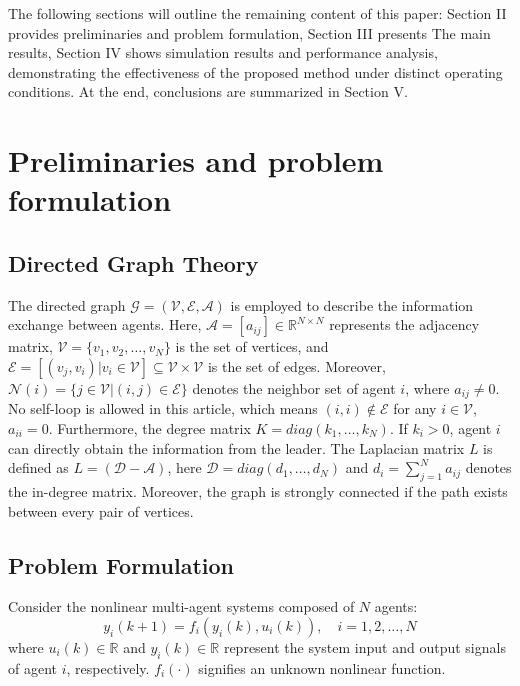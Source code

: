 \documentclass[journal,onecolumn]{IEEEtran}
\begin{document}
    The following sections will outline the remaining content of this paper:
    Section II provides preliminaries and problem formulation, Section III presents The main results, Section IV shows simulation results and performance analysis, demonstrating the effectiveness of the proposed method under distinct operating conditions. At the end, conclusions are summarized in Section V.


\section{Preliminaries and problem formulation}\label{section:2}
\subsection{Directed Graph Theory}

\indent The directed graph $ \mathcal{G} = (\mathcal{V}, \mathcal{E}, \mathcal{A}) $ is employed to describe the information exchange between agents. Here, $ \mathcal{A} = [a_{ij}] \in \mathbb{R}^{N \times N} $ represents the adjacency matrix, $ \mathcal{V}=\{v_1, v_2,\dots,v_N\} $ is the set of vertices, and $ \mathcal{E} = [(v_j,v_i)|v_i \in \mathcal{V} ] \subseteq \mathcal{V} \times \mathcal{V}$ is the set of edges. Moreover, $ \mathcal{N}(i) = \{j \in \mathcal{V} |(i,j) \in \mathcal{E}\} $ denotes the neighbor set of agent $ i $, where $ a_{i j} \neq 0$. No self-loop is allowed in this article, which means $(i, i) \notin \mathcal{E}$ for any $ i \in \mathcal{V} $, $ a_{ii}=0$. Furthermore, the degree matrix $ K = diag(k_1,\dots,k_N)$. If $ k_i > 0$, agent $ i $ can directly obtain the information from the leader. The Laplacian matrix $ L $ is defined as $ L = (\mathcal{D}-\mathcal{A})$, here $\mathcal{D} = diag({d_1,\dots,d_N})$ and $d_i=\sum_{j=1}^{N} a_{i j}$ denotes the in-degree matrix. Moreover, the graph is strongly connected if the path exists between every pair of vertices.

\subsection{Problem Formulation}

Consider the nonlinear multi-agent systems composed of $ N $ agents:
\begin{equation}
    \label{model 1}
    y_i(k+1) = f_i(y_i(k), u_i(k)), \quad i = 1, 2, \dots, N
\end{equation}
where $u_i(k) \in \mathbb{R}$ and $y_i(k) \in \mathbb{R}$ represent the system input and output signals of agent $ i $, respectively. $f_i(\cdot)$ signifies an unknown nonlinear function.
\end{document}
